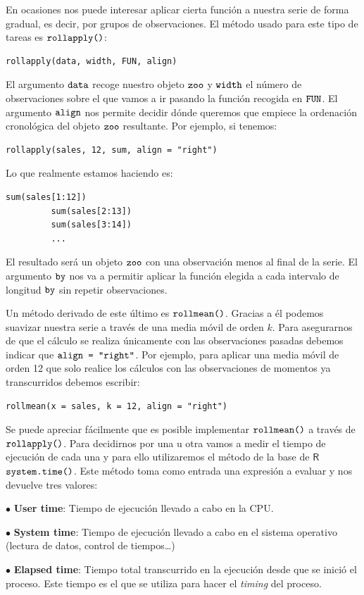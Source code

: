 En ocasiones nos puede interesar aplicar cierta función a nuestra serie de forma gradual, es decir, por grupos de observaciones. El método usado para este tipo de tareas es $\verb!rollapply()!$:
\begin{Verbatim}[fontsize=\footnotesize]
rollapply(data, width, FUN, align)
\end{Verbatim}

El argumento $\verb!data!$ recoge nuestro objeto $\verb!zoo!$ y $\verb!width!$ el número de observaciones sobre el que vamos a ir pasando la función recogida en $\verb!FUN!$. El argumento $\verb!align!$ nos permite decidir dónde queremos que empiece la ordenación cronológica del objeto $\verb!zoo!$ resultante. Por ejemplo, si tenemos:
\begin{Verbatim}[fontsize=\footnotesize]
rollapply(sales, 12, sum, align = "right")
\end{Verbatim}

Lo que realmente estamos haciendo es:
\begin{Verbatim}[fontsize=\footnotesize]
         sum(sales[1:12])
         sum(sales[2:13])
         sum(sales[3:14])
         ...
\end{Verbatim}

El resultado será un objeto $\verb!zoo!$ con una observación menos al final de la serie. El argumento $\verb!by!$ nos va a permitir aplicar la función elegida a cada intervalo de longitud $\verb!by!$ sin repetir observaciones.

Un método derivado de este último es $\verb!rollmean()!$. Gracias a él podemos suavizar nuestra serie a través de una media móvil de orden $k$. Para asegurarnos de que el cálculo se realiza únicamente con las observaciones pasadas debemos indicar que $\verb!align = "right"!$. Por ejemplo, para aplicar una media móvil de orden 12 que solo realice los cálculos con las observaciones de momentos ya transcurridos debemos escribir:
\begin{Verbatim}[fontsize=\footnotesize]
rollmean(x = sales, k = 12, align = "right")
\end{Verbatim}

Se puede apreciar fácilmente que es posible implementar $\verb!rollmean()!$ a través de $\verb!rollapply()!$. Para decidirnos por una u otra vamos a medir el tiempo de ejecución de cada una y para ello utilizaremos el método de la base de $\textsf{R}$ $\verb!system.time()!$. Este método toma como entrada una expresión a evaluar y nos devuelve tres valores:
\begin{itemize*}
  \item[$\bullet$] \textbf{User time}: Tiempo de ejecución llevado a cabo en la CPU.
  \item[$\bullet$] \textbf{System time}: Tiempo de ejecución llevado a cabo en el sistema operativo (lectura de datos, control de tiempos…)
  \item[$\bullet$] \textbf{Elapsed time}: Tiempo total transcurrido en la ejecución desde que se inició el proceso. Este tiempo es el que se utiliza para hacer el \textit{timing} del proceso.
\end{itemize*}

